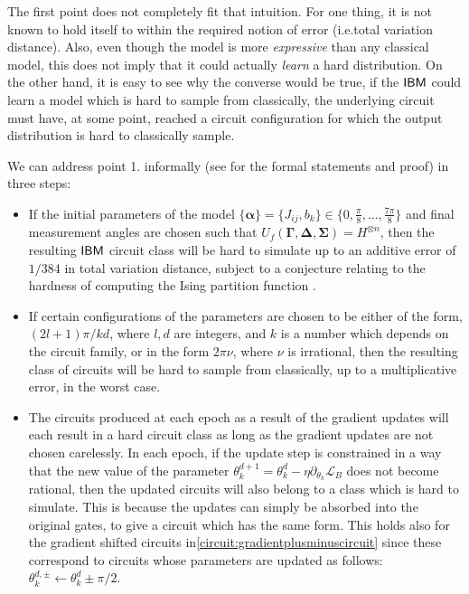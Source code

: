 The first point does not completely fit that intuition. For one thing, it is not known to hold itself to within the required notion of error (i.e.\@ total variation distance). Also, even though the model is more \textit{expressive} than any classical model\cite{du_expressive_2018}, this does not imply that it could actually \textit{learn} a hard distribution. On the other hand, it is easy to see why the converse would be true, if the $\textsf{IBM}$ could learn a model which is hard to sample from classically, the underlying circuit must have, at some point, reached a circuit configuration for which the output distribution is hard to classically sample.

We can address point 1. informally (see  for the formal statements and proof) in three steps:
\begin{itemize}
    \item If the initial parameters of the model $\{\boldsymbol \alpha\} = \{J_{ij}, b_k\}\in\{0,\frac{\pi}{8}, \dots, \frac{7\pi}{8}\}$ and final measurement angles are chosen such that $U_f \left( \mathbf{\Gamma}, \mathbf{\Delta}, \mathbf{\Sigma} \right) = H^{\otimes n}$, then the resulting $\textsf{IBM}$ circuit class will be hard to simulate up to an additive error of $1/384$ in total variation distance, subject to a conjecture relating to the hardness of computing the Ising partition function \cite{bremner_average-case_2016}.
    \item If certain configurations of the parameters are chosen to be either of the form, $(2l+1)\pi/kd$, where $l, d$ are integers, and $k$ is a number which depends on the circuit family, or in the form $2\pi\nu$, where $\nu$ is irrational, then the resulting class of circuits will be hard to sample from classically, up to a multiplicative error, in the worst case.
    \item The circuits produced at each epoch as a result of the gradient updates will each result in a hard circuit class as long as the gradient updates are not chosen carelessly. In each epoch, if the update step is constrained in a way that the new value of the parameter 
$\theta^{d+1}_k= \theta_k^{d} - \eta\partial_{\theta_k}\mathcal{L}_B$ does not become rational, then the updated circuits will also belong to a class which is hard to simulate. This is because the updates can simply be absorbed into the original gates, to give a circuit which has the same form. This holds also for the gradient shifted circuits in\eqref{circuit:gradientplusminuscircuit} since these correspond to circuits whose parameters are updated as follows: $\theta^{d, \pm}_k \leftarrow \theta_k^{d} \pm \pi/2$.
\end{itemize}

